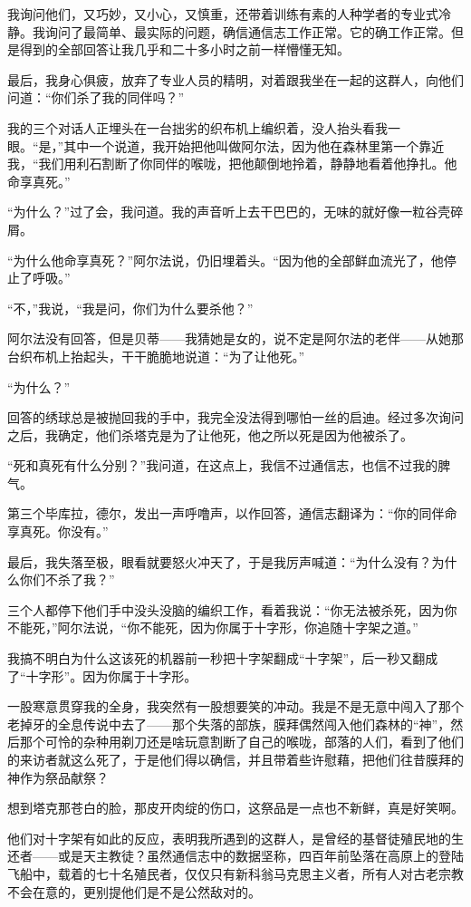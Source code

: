 \documentclass[AutoFakeBold=true]{book}
\begin{document}
我询问他们，又巧妙，又小心，又慎重，还带着训练有素的人种学者的专业式冷静。我询问了最简单、最实际的问题，确信通信志工作正常。它的确工作正常。但是得到的全部回答让我几乎和二十多小时之前一样懵懂无知。

最后，我身心俱疲，放弃了专业人员的精明，对着跟我坐在一起的这群人，向他们问道：``你们杀了我的同伴吗？''

我的三个对话人正埋头在一台拙劣的织布机上编织着，没人抬头看我一眼。``是，''其中一个说道，我开始把他叫做阿尔法，因为他在森林里第一个靠近我，``我们用利石割断了你同伴的喉咙，把他颠倒地拎着，静静地看着他挣扎。他命享真死。''

``为什么？''过了会，我问道。我的声音听上去干巴巴的，无味的就好像一粒谷壳碎屑。

``为什么他命享真死？''阿尔法说，仍旧埋着头。``因为他的全部鲜血流光了，他停止了呼吸。''

``不，''我说，``我是问，你们为什么要杀他？''

阿尔法没有回答，但是贝蒂——我猜她是女的，说不定是阿尔法的老伴——从她那台织布机上抬起头，干干脆脆地说道：``为了让他死。''

``为什么？''

回答的绣球总是被抛回我的手中，我完全没法得到哪怕一丝的启迪。经过多次询问之后，我确定，他们杀塔克是为了让他死，他之所以死是因为他被杀了。

``死和真死有什么分别？''我问道，在这点上，我信不过通信志，也信不过我的脾气。

第三个毕库拉，德尔，发出一声呼噜声，以作回答，通信志翻译为：``你的同伴命享真死。你没有。''

最后，我失落至极，眼看就要怒火冲天了，于是我厉声喊道：``为什么没有？为什么你们不杀了我？''

三个人都停下他们手中没头没脑的编织工作，看着我说：``你无法被杀死，因为你不能死，''阿尔法说，``你不能死，因为你属于十字形，你追随十字架之道。''

我搞不明白为什么这该死的机器前一秒把十字架翻成``十字架''，后一秒又翻成了``十字形''。因为你属于十字形。

一股寒意贯穿我的全身，我突然有一股想要笑的冲动。我是不是无意中闯入了那个老掉牙的全息传说中去了——那个失落的部族，膜拜偶然闯入他们森林的``神''，然后那个可怜的杂种用剃刀还是啥玩意割断了自己的喉咙，部落的人们，看到了他们的来访者就这么死了，于是他们得以确信，并且带着些许慰藉，把他们往昔膜拜的神作为祭品献祭？

想到塔克那苍白的脸，那皮开肉绽的伤口，这祭品是一点也不新鲜，真是好笑啊。

他们对十字架有如此的反应，表明我所遇到的这群人，是曾经的基督徒殖民地的生还者——或是天主教徒？虽然通信志中的数据坚称，四百年前坠落在高原上的登陆飞船中，载着的七十名殖民者，仅仅只有新科翁马克思主义者，所有人对古老宗教不会在意的，更别提他们是不是公然敌对的。
\end{document}
